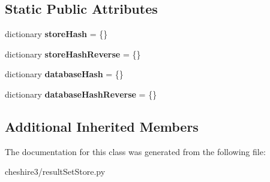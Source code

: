 \subsection*{Static Public Attributes}
\begin{DoxyCompactItemize}
\item 
\hypertarget{classcheshire3_1_1result_set_store_1_1_simple_result_set_store_a5b688cccc0112b7dd1c59d17c3f8c037}{dictionary {\bfseries store\-Hash} = \{\}}\label{classcheshire3_1_1result_set_store_1_1_simple_result_set_store_a5b688cccc0112b7dd1c59d17c3f8c037}

\item 
\hypertarget{classcheshire3_1_1result_set_store_1_1_simple_result_set_store_a953dd15864c8524fd1bd9b615ee4a875}{dictionary {\bfseries store\-Hash\-Reverse} = \{\}}\label{classcheshire3_1_1result_set_store_1_1_simple_result_set_store_a953dd15864c8524fd1bd9b615ee4a875}

\item 
\hypertarget{classcheshire3_1_1result_set_store_1_1_simple_result_set_store_aea06d85fb1ae8b3820ccba756d53c856}{dictionary {\bfseries database\-Hash} = \{\}}\label{classcheshire3_1_1result_set_store_1_1_simple_result_set_store_aea06d85fb1ae8b3820ccba756d53c856}

\item 
\hypertarget{classcheshire3_1_1result_set_store_1_1_simple_result_set_store_a96564516897fd6c7f68f2cc5b7ca092e}{dictionary {\bfseries database\-Hash\-Reverse} = \{\}}\label{classcheshire3_1_1result_set_store_1_1_simple_result_set_store_a96564516897fd6c7f68f2cc5b7ca092e}

\end{DoxyCompactItemize}
\subsection*{Additional Inherited Members}


The documentation for this class was generated from the following file\-:\begin{DoxyCompactItemize}
\item 
cheshire3/result\-Set\-Store.\-py\end{DoxyCompactItemize}
